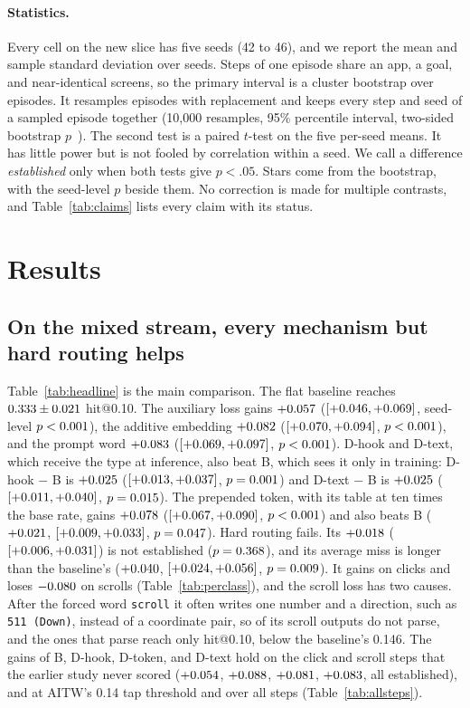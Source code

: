 \documentclass[letterpaper]{article} %
\makeatletter
\newcommand{\hitat}[1]{hit@#1}
\makeatother
\begin{document}
\paragraph{Statistics.}
Every cell on the new slice has five seeds (42 to 46), and we report the mean and sample standard deviation over seeds. Steps of one episode share an app, a goal, and near-identical screens, so the primary interval is a cluster bootstrap over episodes. It resamples episodes with replacement and keeps every step and seed of a sampled episode together (10,000 resamples, 95\% percentile interval, two-sided bootstrap $p$~\citep{efron}). The second test is a paired $t$-test on the five per-seed means. It has little power but is not fooled by correlation within a seed. We call a difference \emph{established} only when both tests give $p < .05$. Stars come from the bootstrap, with the seed-level $p$ beside them. No correction is made for multiple contrasts, and Table~\ref{tab:claims} lists every claim with its status.

\section{Results}
\label{sec:results}

\subsection{On the mixed stream, every mechanism but hard routing helps}
\label{sec:headline}
Table~\ref{tab:headline} is the main comparison. The flat baseline reaches $0.333 \pm 0.021$ \hitat{0.10}. The auxiliary loss gains $+0.057$ ($[+0.046, +0.069]$, seed-level $p < 0.001$), the additive embedding $+0.082$ ($[+0.070, +0.094]$, $p < 0.001$), and the prompt word $+0.083$ ($[+0.069, +0.097]$, $p < 0.001$). D-hook and D-text, which receive the type at inference, also beat B, which sees it only in training: D-hook $-$ B is $+0.025$ ($[+0.013, +0.037]$, $p = 0.001$) and D-text $-$ B is $+0.025$ ($[+0.011, +0.040]$, $p = 0.015$). The prepended token, with its table at ten times the base rate, gains $+0.078$ ($[+0.067, +0.090]$, $p < 0.001$) and also beats B ($+0.021$, $[+0.009, +0.033]$, $p = 0.047$). Hard routing fails. Its $+0.018$ ($[+0.006, +0.031]$) is not established ($p = 0.368$), and its average miss is longer than the baseline's ($+0.040$, $[+0.024, +0.056]$, $p = 0.009$). It gains on clicks and loses $-0.080$ on scrolls (Table~\ref{tab:perclass}), and the scroll loss has two causes. After the forced word \texttt{scroll} it often writes one number and a direction, such as \texttt{511 (Down)}, instead of a coordinate pair, so \nUnparsedCscroll{} of its scroll outputs do not parse, and the ones that parse reach only \nUnparsedCscrollparsed{} \hitat{0.10}, below the baseline's 0.146.
The gains of B, D-hook, D-token, and D-text hold on the \nSliceFresh{} click and scroll steps that the earlier study never scored ($+0.054$, $+0.088$, $+0.081$, $+0.083$, all established), and at AITW's 0.14 tap threshold and over all steps (Table~\ref{tab:allsteps}).
\end{document}
